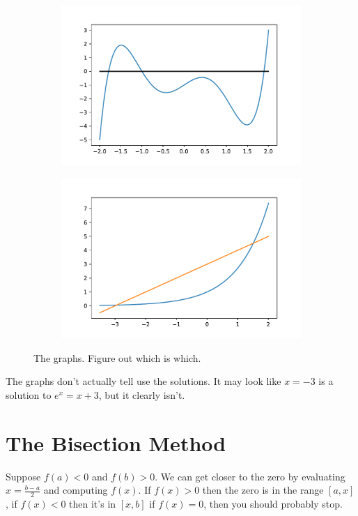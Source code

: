 \documentclass[11pt,letterpaper]{article}
\begin{document}
\begin{figure}[!ht]
 \centering
 \begin{subfigure}{.4\textwidth}
  \includegraphics[width=.8\textwidth]{images/exa1.pdf}
 \end{subfigure}
 \begin{subfigure}{.4\textwidth}
  \includegraphics[width=.8\textwidth]{images/exa2.pdf}
 \end{subfigure}
 \caption{The graphs. Figure out which is which.}
 \label{fig:exa}
\end{figure}

The graphs don't actually tell use the solutions. It may look like $x=-3$ is a solution to
$e^x=x+3$, but it clearly isn't.

\section{The Bisection Method}

Suppose $f(a)<0$ and $f(b)>0$. We can get closer to the zero by
evaluating $x = \frac{b-a}{2}$ and computing $f(x)$. If $f(x)>0$ then the zero is in 
the range $[a,x]$, if $f(x)<0$ then it's in $[x,b]$ if $f(x)=0$, then you should probably
stop.
\end{document}
